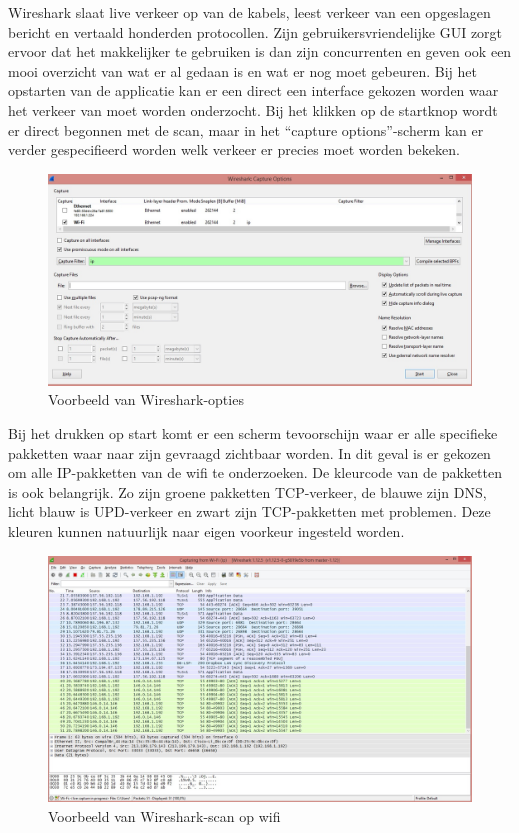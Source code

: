 \documentclass[pdftex,a4paper,12pt]{report}
\begin{document}
Wireshark slaat live verkeer op van de kabels, leest verkeer van een opgeslagen bericht en vertaald honderden protocollen. Zijn gebruikersvriendelijke GUI zorgt ervoor dat het makkelijker te gebruiken is dan zijn concurrenten en geven ook een mooi overzicht van wat er al gedaan is en wat er nog moet gebeuren. Bij het opstarten van de applicatie kan er een direct een interface gekozen worden waar het verkeer van moet worden onderzocht. Bij het klikken op de startknop wordt er direct begonnen met de scan, maar in het "`capture options"'-scherm kan er verder gespecifieerd worden welk verkeer er precies moet worden bekeken.

\begin{figure}[H]
\begin{center}
\includegraphics[scale=0.50]{img/Wireshark1}
\end{center}
\caption{Voorbeeld van Wireshark-opties}
\end{figure}

Bij het drukken op start komt er een scherm tevoorschijn waar er alle specifieke pakketten waar naar zijn gevraagd zichtbaar worden. In dit geval is er gekozen om alle IP-pakketten van de wifi te onderzoeken. De kleurcode van de pakketten is ook belangrijk. Zo zijn groene pakketten TCP-verkeer, de blauwe zijn DNS, licht blauw is UPD-verkeer en zwart zijn TCP-pakketten met problemen. Deze kleuren kunnen natuurlijk naar eigen voorkeur ingesteld worden. \citep{Hoffm2014}
 
\begin{figure}[H]
\begin{center}
\includegraphics[scale=0.40]{img/Wireshark2}
\end{center}
\caption{Voorbeeld van Wireshark-scan op wifi}
\end{figure}
\end{document}
